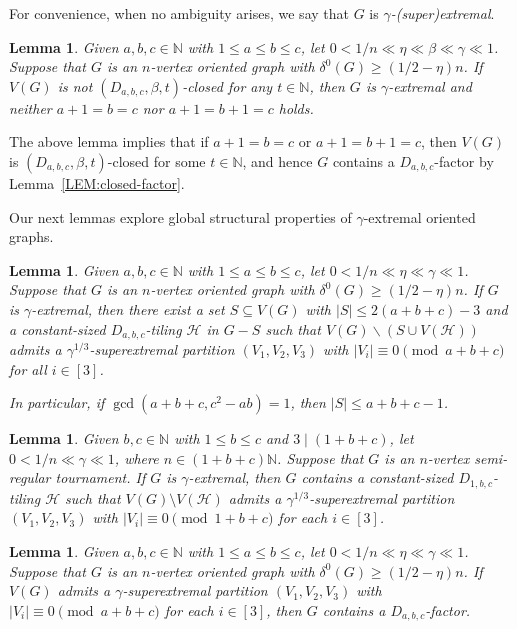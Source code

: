 \documentclass[11pt,a4paper,reqno]{amsart}
\newtheorem{lemma}[theorem]{Lemma}
\theoremstyle{definition} %
\begin{document}
For convenience, when no ambiguity arises, we say that $G$ is \emph{$\gamma$-(super)extremal}.


\begin{lemma}\label{LEM:nonext}
Given $a,b,c \in \mathbb{N}$ with $1\leqslant a\leqslant b\leqslant c$, let
$0<1/n\ll \eta \ll \beta \ll \gamma \ll 1$.
Suppose that $G$ is an $n$-vertex oriented graph with
$\delta^0(G)\geqslant (1/2-\eta)n$.
If $V(G)$ is not $(D_{a,b,c},\beta,t)$-closed for any $t\in \mathbb{N}$, then
$G$ is $\gamma$-extremal and  neither $a+1=b=c$ nor $a+1=b+1=c$ holds.
\end{lemma}

The above lemma implies that if $a+1=b=c$ or $a+1=b+1=c$, then
$V(G)$ is $(D_{a,b,c},\beta,t)$-closed for some $t\in\mathbb{N}$, and hence
$G$ contains a $D_{a,b,c}$-factor by Lemma~\ref{LEM:closed-factor}.

Our next lemmas explore global structural properties of $\gamma$-extremal oriented graphs.

\begin{lemma}\label{LEM:abcbalance}
Given $a,b,c\in \mathbb{N}$ with  $1\leqslant a\leqslant b\leqslant c$, let
$0<1/n \ll \eta \ll \gamma\ll 1$.
Suppose that $G$ is an $n$-vertex oriented graph with
$\delta^0(G)\geqslant(1/2-\eta)n$.
If $G$ is $\gamma$-extremal, then there exist a set $S\subseteq V(G)$ with
$|S|\leqslant 2(a+b+c)-3$ and a constant-sized $D_{a,b,c}$-tiling $\mathcal{H}$ in $G-S$
such that $V(G)\backslash (S\cup V(\mathcal{H}))$ admits a $\gamma^{1/3}$-superextremal partition
$(V_1,V_2,V_3)$ with $|V_i|\equiv 0\pmod{a+b+c}$ for all $i\in[3]$.

In particular, if $\gcd(a+b+c,c^2-ab)=1$, then $|S|\leqslant a+b+c-1$.
\end{lemma}



\begin{lemma}\label{LEM:1bcbalance}
Given $b,c\in \mathbb{N}$ with  $1\leqslant b\leqslant c$ and $3\mid(1+b+c)$, let
$0<1/n\ll \gamma\ll 1$, where $n\in(1+b+c)\mathbb{N}$.
Suppose that $G$ is an $n$-vertex semi-regular tournament.
If $G$ is $\gamma$-extremal, then $G$ contains a constant-sized $D_{1,b,c}$-tiling $\mathcal{H}$ such that
$V(G)\setminus V(\mathcal{H})$ admits a $\gamma^{1/3}$-superextremal partition $(V_1,V_2,V_3)$ with
$|V_i|\equiv 0\pmod{1+b+c}$ for each $i\in[3]$.
\end{lemma}

\begin{lemma}\label{LEM:balancefactor}
Given $a,b,c\in \mathbb{N}$ with  $1\leqslant a\leqslant b\leqslant c$, let
$0<1/n\ll \eta \ll \gamma\ll 1$.
Suppose that $G$ is an $n$-vertex oriented graph with
$\delta^0(G)\geqslant(1/2-\eta)n$.
If $V(G)$ admits a $\gamma$-superextremal partition $(V_1,V_2,V_3)$ with
$|V_i|\equiv 0\pmod{a+b+c}$ for each $i\in[3]$, then $G$ contains a $D_{a,b,c}$-factor.
\end{lemma}
\end{document}
